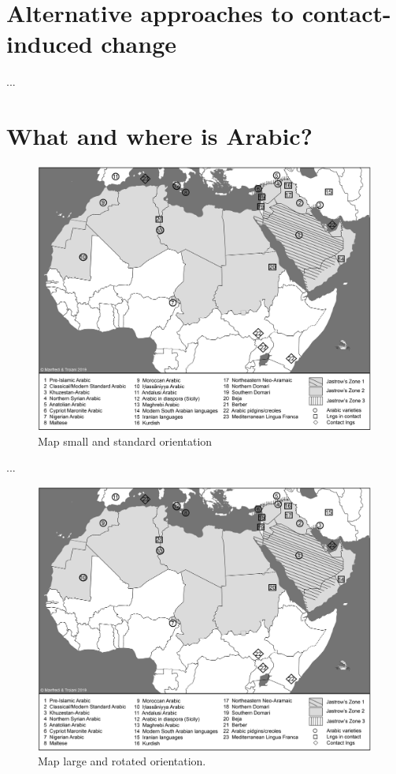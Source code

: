 \documentclass[output=paper]{langsci/langscibook}
\begin{document}
\section{Alternative approaches to contact-induced change} 
...

\section{What and where is Arabic?}

\begin{figure}
\includegraphics[width=\textwidth]{figures/Monde_arabe.jpg}
\caption{Map small and standard orientation}
\label{map}
\end{figure}

...
  
\begin{figure}
\includegraphics[height=.66\textheight, angle=90]{figures/Monde_arabe.jpg}
\caption{Map large and rotated orientation.}
\label{map}
\end{figure}
\end{document}
